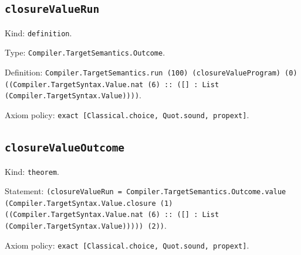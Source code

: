 \documentclass[11pt]{article}
\begin{document}
\subsection*{\texttt{closureValueRun}}
\noindent Kind: \texttt{definition}.\par
\noindent Type: \texttt{Compiler.TargetSemantics.Outcome}.\par
\noindent Definition: \texttt{Compiler.TargetSemantics.run (100) (closureValueProgram) (0) ((Compiler.TargetSyntax.Value.nat (6) :: ([] : List (Compiler.TargetSyntax.Value))))}.\par
\noindent Axiom policy: \texttt{exact [Classical.choice, Quot.sound, propext]}.\par
\subsection*{\texttt{closureValueOutcome}}
\noindent Kind: \texttt{theorem}.\par
\noindent Statement: \texttt{(closureValueRun = Compiler.TargetSemantics.Outcome.value (Compiler.TargetSyntax.Value.closure (1) ((Compiler.TargetSyntax.Value.nat (6) :: ([] : List (Compiler.TargetSyntax.Value))))) (2))}.\par
\noindent Axiom policy: \texttt{exact [Classical.choice, Quot.sound, propext]}.\par
\end{document}
